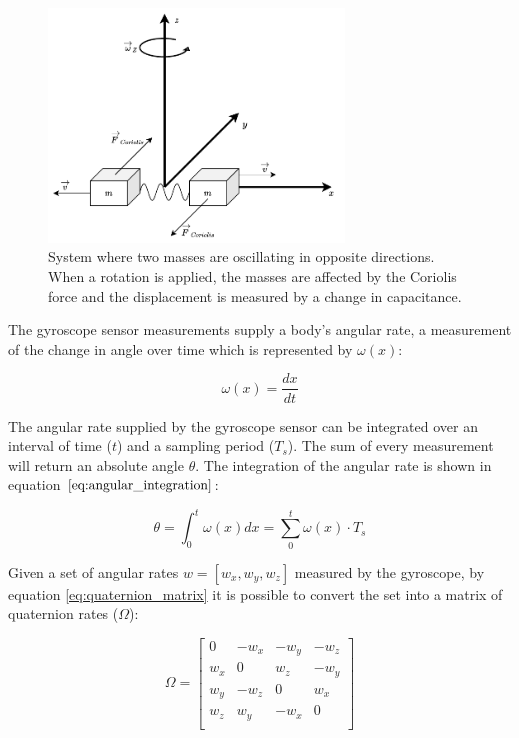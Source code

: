\begin{figure}[!h]
    \centering
    \includegraphics[width=0.7\textwidth]{figures/coriolis.pdf}
    \caption{ System where two masses are oscillating in opposite directions. When a rotation is applied, the masses are affected by the Coriolis force and the displacement is measured by a change in capacitance.}
    \label{fig:coriolis}
\end{figure}

The gyroscope sensor measurements supply a body’s angular rate, a measurement of the change in angle over time which is represented by $\omega(x)$:

\begin{equation}
    \omega(x) = \frac{dx}{dt}
\end{equation}

The angular rate supplied by the gyroscope sensor can be integrated over an interval of time ($t$) and a sampling period ($T_s$). The sum of every measurement will return an absolute angle $\theta$. The integration of the angular rate is shown in equation $\ref{eq:angular_integration}$:

\begin{equation}
    \theta = \int_{0}^{t} \omega(x) dx = \sum_{0}^{t} \omega(x)\cdot T_s
    \label{eq:angular_integration}
\end{equation}

Given a set of angular rates $w=[w_x,w_y,w_z]$ measured by the gyroscope, by equation \ref{eq:quaternion_matrix} it is possible to convert the set into a matrix of quaternion rates ($\Omega$):

\begin{equation}
    \Omega = \begin{bmatrix}
        0   & -w_x & -w_y & -w_z \\
        w_x & 0    & w_z  & -w_y \\
        w_y & -w_z & 0    & w_x  \\
        w_z & w_y  & -w_x & 0    \\
    \end{bmatrix}
\end{equation}

